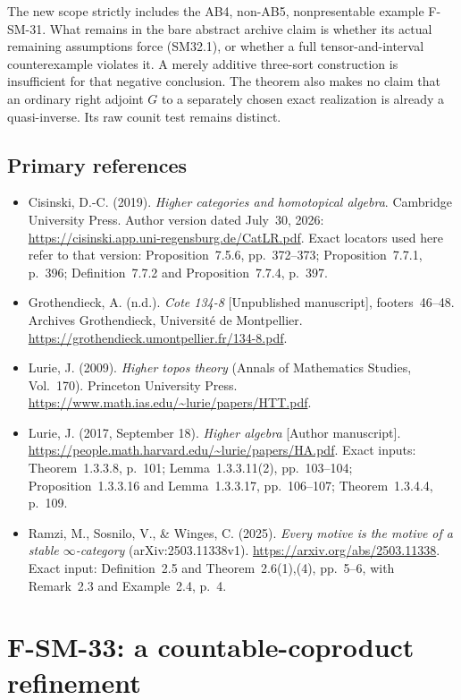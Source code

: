 \documentclass[11pt,a4paper]{article}
\theoremstyle{definition}\newtheorem{definition}[theorem]{Definition}
\theoremstyle{remark}\newtheorem{remark}[theorem]{Remark}
\begin{document}
The new scope strictly includes the AB4, non-AB5,
nonpresentable example F-SM-31.  What remains in the bare
abstract archive claim is whether its actual remaining
assumptions force (SM32.1), or whether a full tensor-and-interval
counterexample violates it.  A merely additive three-sort
construction is insufficient for that negative conclusion.
The theorem also makes no claim that an ordinary right adjoint
\(G\) to a separately chosen exact realization is already a
quasi-inverse.  Its raw counit test remains distinct.

\subsection{Primary references}
\begin{itemize}
\item Cisinski, D.-C. (2019). \emph{Higher categories and
homotopical algebra}. Cambridge University Press.
Author version dated July~30, 2026:
\url{https://cisinski.app.uni-regensburg.de/CatLR.pdf}.
Exact locators used here refer to that version:
Proposition~7.5.6, pp.~372--373; Proposition~7.7.1, p.~396;
Definition~7.7.2 and Proposition~7.7.4, p.~397.
\item Grothendieck, A. (n.d.). \emph{Cote 134-8}
[Unpublished manuscript], footers~46--48.
Archives Grothendieck, Universit\'e de Montpellier.
\url{https://grothendieck.umontpellier.fr/134-8.pdf}.
\item Lurie, J. (2009). \emph{Higher topos theory}
(Annals of Mathematics Studies, Vol.~170).
Princeton University Press.
\url{https://www.math.ias.edu/~lurie/papers/HTT.pdf}.
\item Lurie, J. (2017, September 18). \emph{Higher algebra}
[Author manuscript].
\url{https://people.math.harvard.edu/~lurie/papers/HA.pdf}.
Exact inputs: Theorem~1.3.3.8, p.~101;
Lemma~1.3.3.11(2), pp.~103--104;
Proposition~1.3.3.16 and Lemma~1.3.3.17, pp.~106--107;
Theorem~1.3.4.4, p.~109.
\item Ramzi, M., Sosnilo, V., \& Winges, C. (2025).
\emph{Every motive is the motive of a stable
\(\infty\)-category} (arXiv:2503.11338v1).
\url{https://arxiv.org/abs/2503.11338}.
Exact input: Definition~2.5 and Theorem~2.6(1),(4),
pp.~5--6, with Remark~2.3 and Example~2.4, p.~4.
\end{itemize}


\section{F-SM-33: a countable-coproduct refinement}
\end{document}
